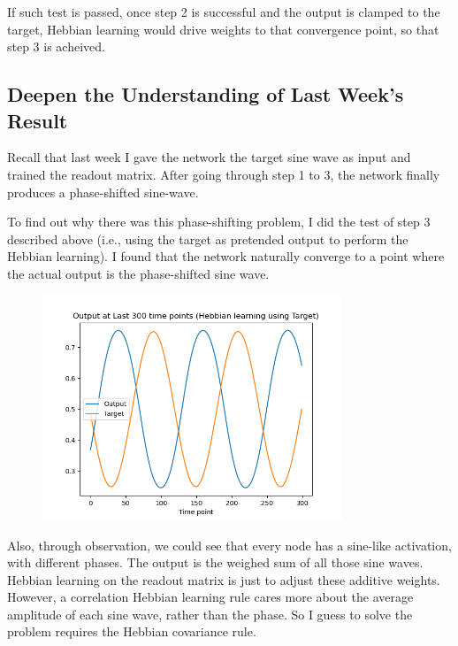 \documentclass[12pt, a4paper]{article}
\begin{document}
If such test is passed, once step 2 is successful and the output is clamped to the target, Hebbian learning would drive weights to that convergence point, so that step 3 is acheived.

\newpage

\subsection*{Deepen the Understanding of Last Week's Result}

Recall that last week I gave the network the target sine wave as input and trained the readout matrix. After going through step 1 to 3, the network finally produces a phase-shifted sine-wave. 

To find out why there was this phase-shifting problem, I did the test of step 3 described above (i.e., using the target as pretended output to perform the Hebbian learning). I found that the network naturally converge to a point where the actual output is the phase-shifted sine wave.

\begin{figure}[H]
    \centering
    \includegraphics[width=0.8\textwidth]{RNN/FORCE/fig/FORCE_targethebb_lastoutput.png} \\
\end{figure}

Also, through observation, we could see that every node has a sine-like activation, with different phases. The output is the weighed sum of all those sine waves. Hebbian learning on the readout matrix is just to adjust these additive weights. However, a correlation Hebbian learning rule cares more about the average amplitude of each sine wave, rather than the phase. So I guess to solve the problem requires the Hebbian covariance rule.
\end{document}
